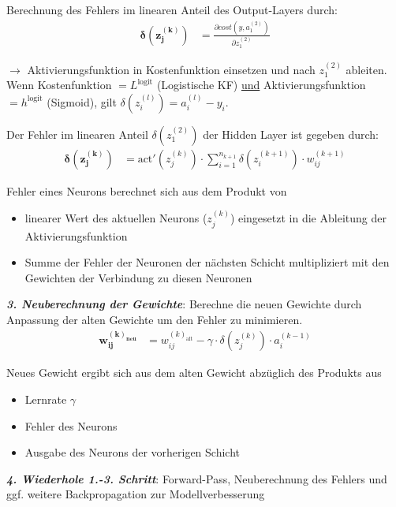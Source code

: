 Berechnung des Fehlers im linearen Anteil des Output-Layers durch:
\begin{equation*}
    \begin{aligned}
        \boldsymbol{\delta(z_j^{(k)})}  &= \frac{\partial cost(y, a_1^{(2)})}{\partial z_1^{(2)}}
    \end{aligned}
\end{equation*}

$\rightarrow$ Aktivierungsfunktion in Kostenfunktion einsetzen und nach $z_1^{(2)}$ ableiten.\\

Wenn Kostenfunktion $=L^\text{logit}$ (Logistische KF) \underline{und} Aktivierungsfunktion $=h^\text{logit}$ (Sigmoid), gilt $\delta(z_i^{(l)})=a_i^{(l)}-y_i$.

Der Fehler im linearen Anteil $\delta(z_1^{(2)})$ der Hidden Layer ist gegeben durch:
\begin{equation*}
    \begin{aligned}
        \boldsymbol{\delta(z_j^{(k)})}  &= \text{act}'(z_j^{(k)})\cdot\sum_{i=1}^{n_{k+1}}\delta(z_i^{(k+1)})\cdot w_{ij}^{(k+1)}
    \end{aligned}
\end{equation*}

Fehler eines Neurons berechnet sich aus dem Produkt von
\begin{itemize}
    \item linearer Wert des aktuellen Neurons ($z_j^{(k)}$) eingesetzt in die Ableitung der Aktivierungsfunktion
    \item Summe der Fehler der Neuronen der nächsten Schicht multipliziert mit den Gewichten der Verbindung zu diesen Neuronen\\
\end{itemize}

\emph{\textbf{3. Neuberechnung der Gewichte}}: Berechne die neuen Gewichte durch Anpassung der alten Gewichte um den Fehler zu minimieren.
\begin{equation*}
    \begin{aligned}
        \boldsymbol{w_{ij}^{(k)_\text{neu}}}  &= w_{ij}^{(k)_\text{alt}}-\gamma\cdot\delta(z_j^{(k)})\cdot a_i^{(k-1)}
    \end{aligned}
\end{equation*}

Neues Gewicht ergibt sich aus dem alten Gewicht abzüglich des Produkts aus
\begin{itemize}
    \item Lernrate $\gamma$
    \item Fehler des Neurons
    \item Ausgabe des Neurons der vorherigen Schicht\\
\end{itemize}

\emph{\textbf{4. Wiederhole 1.-3. Schritt}}: Forward-Pass, Neuberechnung des Fehlers und ggf. weitere Backpropagation zur Modellverbesserung